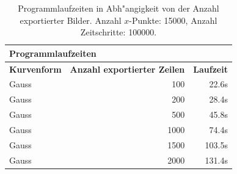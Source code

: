 \begin{refsection}
\begin{table}
\begin{center}
\begin{tabular}{|l|r|r|}
	\hline
	\multicolumn{3}{|l|}{\textbf{Programmlaufzeiten}}\\
	\hline
	{\textbf{Kurvenform}} 	& {\textbf{Anzahl exportierter Zeilen}} 	& {\textbf{Laufzeit}}\\
	\hline
	Gauss	& 	100	& 22.6s \\
	Gauss	& 	200	& 28.4s \\
	Gauss	& 	500	& 45.8s \\
	Gauss	& 	1000	& 74.4s \\
	Gauss	&	1500	& 103.5s\\
	Gauss	& 	2000	& 131.4s \\
	\hline
\end{tabular}
\end{center}
\caption{Programmlaufzeiten in Abh"angigkeit von der Anzahl exportierter Bilder.
Anzahl $x$-Punkte: 15000, Anzahl Zeitschritte: 100000.
\label{stosswellen:berechnungszeit}}
\end{table}


\end{refsection}
